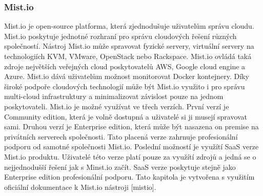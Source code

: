 \subsubsection{Mist.io}
Mist.io je open-source platforma, která zjednodušuje uživatelům správu cloudu. Mist.io poskytuje jednotné rozhraní pro správu cloudových řešení různých společností. Nástroj Mist.io může spravovat fyzické servery, virtuální servery na technologiích KVM, VMware, OpenStack nebo Rackspace. Mist.io ovládá taká zdroje největších veřejných cloud poskytovatelů AWS, Google cloud engine a Azure. Mist.io dává uživatelům možnost monitorovat Docker kontejnery. Díky široké podpoře cloudových technologií může být Mist.io využito i pro správu multi-cloud infrastruktury a minimalizovat závislost pouze na jednom poskytovateli. Mist.io je možné využívat ve třech verzích. První verzí je Community edition, která je volně dostupná a uživatelé si ji musejí spravovat sami. Druhou verzí je Enterprise edition, která může být nasazena on premise na privátních serverech společnosti. Tato placená verze zahrnuje profesionální podporu od samotné společnosti Mist.io. Poslední možností je využítí SaaS verze Mist.io produktu. Uživatelé této verze platí pouze za využítí zdrojů a jedná se o nejjednodušší řešení jak s Minst.io začít. SaaS verze poskytuje stejně jako Enterprise edition profesionální podporu. Tato kapitola je vytvořena s využitím oficiální dokumentace k Mist.io nástroji [mistio].\par
